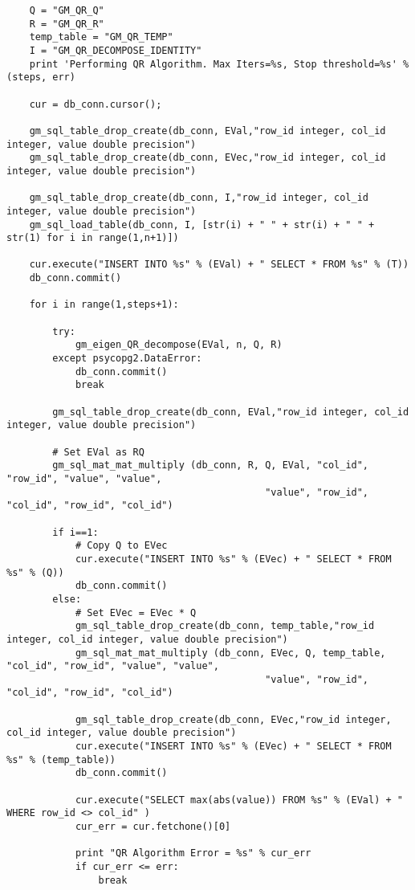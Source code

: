 \begin{lstlisting}
    Q = "GM_QR_Q"
    R = "GM_QR_R"
    temp_table = "GM_QR_TEMP"
    I = "GM_QR_DECOMPOSE_IDENTITY"
    print 'Performing QR Algorithm. Max Iters=%s, Stop threshold=%s' % (steps, err)

    cur = db_conn.cursor();

    gm_sql_table_drop_create(db_conn, EVal,"row_id integer, col_id integer, value double precision")
    gm_sql_table_drop_create(db_conn, EVec,"row_id integer, col_id integer, value double precision")

    gm_sql_table_drop_create(db_conn, I,"row_id integer, col_id integer, value double precision")
    gm_sql_load_table(db_conn, I, [str(i) + " " + str(i) + " " + str(1) for i in range(1,n+1)])

    cur.execute("INSERT INTO %s" % (EVal) + " SELECT * FROM %s" % (T))
    db_conn.commit()

    for i in range(1,steps+1):

        try:
            gm_eigen_QR_decompose(EVal, n, Q, R)
        except psycopg2.DataError:
            db_conn.commit()
            break

        gm_sql_table_drop_create(db_conn, EVal,"row_id integer, col_id integer, value double precision")

        # Set EVal as RQ
        gm_sql_mat_mat_multiply (db_conn, R, Q, EVal, "col_id", "row_id", "value", "value",
                                             "value", "row_id", "col_id", "row_id", "col_id")

        if i==1:
            # Copy Q to EVec
            cur.execute("INSERT INTO %s" % (EVec) + " SELECT * FROM %s" % (Q))
            db_conn.commit()
        else:
            # Set EVec = EVec * Q
            gm_sql_table_drop_create(db_conn, temp_table,"row_id integer, col_id integer, value double precision")
            gm_sql_mat_mat_multiply (db_conn, EVec, Q, temp_table, "col_id", "row_id", "value", "value",
                                             "value", "row_id", "col_id", "row_id", "col_id")

            gm_sql_table_drop_create(db_conn, EVec,"row_id integer, col_id integer, value double precision")
            cur.execute("INSERT INTO %s" % (EVec) + " SELECT * FROM %s" % (temp_table))
            db_conn.commit()

            cur.execute("SELECT max(abs(value)) FROM %s" % (EVal) + " WHERE row_id <> col_id" )
            cur_err = cur.fetchone()[0]

            print "QR Algorithm Error = %s" % cur_err
            if cur_err <= err:
                break


\end{lstlisting}
